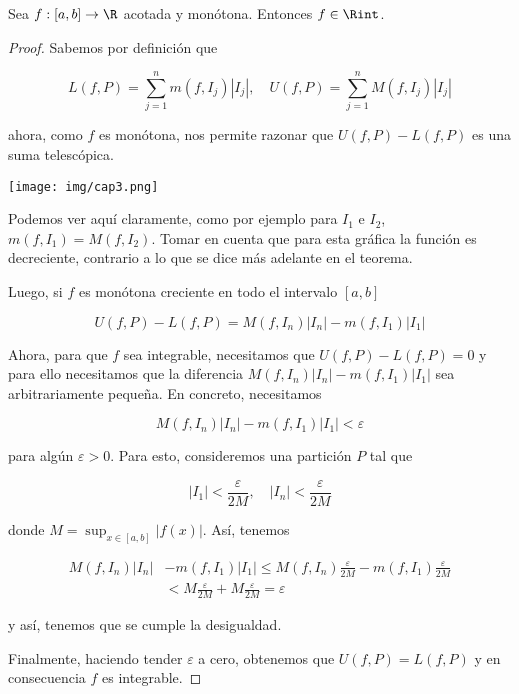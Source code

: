 
\begin{teo}
    Sea $f: [a,b] \rightarrow \R$ acotada y monótona. Entonces $f \in \Rint$.
\end{teo}

\begin{proof}
    Sabemos por definición que
    
    \[
    L(f,P) = \sum_{j=1}^n m(f, I_j)|I_j|, \quad U(f,P) = \sum_{j=1}^n M(f, I_j)|I_j|
    \]
    
    \noindent ahora, como $f$ es monótona, nos permite razonar que $U(f,P) - L(f,P)$ es una suma telescópica.
    
    \begin{marginfigure}
        \centering
        \texttt{[image: img/cap3.png]}
        \caption{\footnotesize Podemos ver aquí claramente, como por ejemplo para $I_1$ e $I_2$, $m(f, I_1) = M(f, I_2)$. Tomar en cuenta que para esta gráfica la función es decreciente, contrario a lo que se dice más adelante en el teorema.}
        
    \end{marginfigure}
    
    Luego, si $f$ es monótona creciente en todo el intervalo $[a,b]$
    
    \[
    U(f,P) - L(f,P) = M(f, I_n)|I_n| - m(f, I_1)|I_1|
    \]
    
    Ahora, para que $f$ sea integrable, necesitamos que $U(f,P) - L(f,P) = 0$ y para ello necesitamos que la diferencia $M(f, I_n)|I_n| - m(f, I_1)|I_1|$ sea arbitrariamente pequeña. En concreto, necesitamos
    
    \[
    M(f, I_n)|I_n| - m(f, I_1)|I_1| < \varepsilon
    \]
    
    \noindent para algún $\varepsilon > 0$. Para esto, consideremos una partición $P$ tal que
    
    \[
    |I_1| < \frac{\varepsilon}{2M}, \quad |I_n| < \frac{\varepsilon}{2M}
    \]
    
    \noindent donde $\displaystyle M = \sup_{x \in [a,b]} |f(x)|$. Así, tenemos
    
    \begin{align*}
        M(f, I_n)|I_n| &- m(f, I_1)|I_1| \leq M(f, I_n)\frac{\varepsilon}{2M} - m(f, I_1)\frac{\varepsilon}{2M} \\
        &< M\frac{\varepsilon}{2M} + M\frac{\varepsilon}{2M} = \varepsilon
    \end{align*}
    
    \noindent y así, tenemos que se cumple la desigualdad.
    
    Finalmente, haciendo tender $\varepsilon$ a cero, obtenemos que $U(f,P) = L(f,P)$ y en consecuencia $f$ es integrable.
\end{proof}

